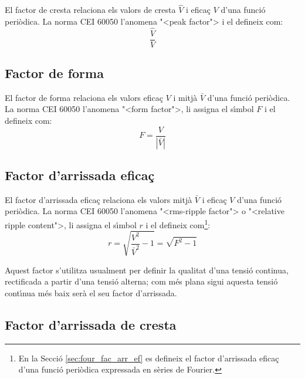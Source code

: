 El factor de cresta relaciona els valors de cresta $\hat{V}$
  i efica\c{c} $V$ d'una funci\'{o} peri\`{o}dica. La norma \textsf{CEI 60050} l'anomena {"<}peak factor{">} i el defineix com:
\begin{equation}
     \frac{\hat{V}}{V}
\end{equation}

\subsection{Factor de forma}

El factor de forma relaciona els valors efica\c{c} $V$
i mitj\`{a} $\bar{V}$ d'una funci\'{o} peri\`{o}dica. La norma \textsf{CEI 60050} l'anomena {"<}form factor{">}, li assigna el s\'{\i}mbol $F$ i el defineix com:
\begin{equation}
    F = \frac{V}{|\bar{V}|}
\end{equation}

\subsection{Factor d'arrissada efica\c{c}}

El factor d'arrissada efica\c{c} relaciona els
valors mitj\`{a} $\bar{V}$ i efica\c{c} $V$ d'una funci\'{o} peri\`{o}dica.
La norma \textsf{CEI 60050} l'anomena {"<}rms-ripple factor{">} o {"<}relative ripple content{">}, li assigna el s\'{\i}mbol $r$ i el defineix com\footnote{En la Secci\'{o} \ref{sec:four_fac_arr_ef} es defineix el factor d'arrissada efica\c{c} d'una funci\'{o} peri\`{o}dica expressada en s\`{e}ries de Fourier.}:
\begin{equation}
    r = \sqrt{\frac{V^2}{\bar{V}^2}-1} = \sqrt{F^2-1}\label{eq:rms_rip}
\end{equation}

Aquest factor s'utilitza usualment per definir la qualitat d'una
tensi\'{o} continua, rectificada a partir d'una tensi\'{o} alterna; com m\'{e}s
plana sigui aquesta tensi\'{o} cont\'{\i}nua m\'{e}s baix ser\`{a} el seu factor
d'arrissada.

\subsection{Factor d'arrissada de cresta}

